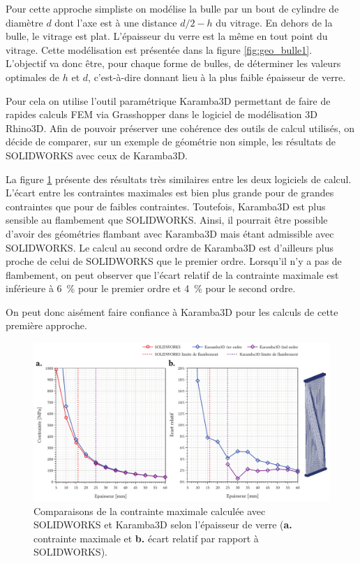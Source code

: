 \documentclass[11pt,titlepage]{article}
\begin{document}
Pour cette approche simpliste on modélise la bulle par un bout de cylindre de diamètre $d$ dont l'axe est à une distance $d/2-h$ du vitrage. En dehors de la bulle, le vitrage est plat. L'épaisseur du verre est la même en tout point du vitrage. Cette modélisation est présentée dans la figure \ref{fig:geo_bulle1}.
\\

L'objectif va donc être, pour chaque forme de bulles, de déterminer les valeurs optimales de $h$ et $d$, c'est-à-dire donnant lieu à la plus faible épaisseur de verre. 

Pour cela on utilise l'outil paramétrique Karamba3D permettant de faire de rapides calculs \acrshort{FEM} via Grasshopper dans le logiciel de modélisation 3D Rhino3D. Afin de pouvoir préserver une cohérence des outils de calcul utilisés, on décide de comparer, sur un exemple de géométrie non simple, les résultats de SOLIDWORKS avec ceux de Karamba3D.

La figure \ref{fig:comp_kar} présente des résultats très similaires entre les deux logiciels de calcul. L'écart entre les contraintes maximales est bien plus grande pour de grandes contraintes que pour de faibles contraintes. Toutefois, Karamba3D est plus sensible au flambement que SOLIDWORKS. Ainsi, il pourrait être possible d'avoir des géométries flambant avec Karamba3D mais étant admissible avec SOLIDWORKS. Le calcul au second ordre de Karamba3D est d'ailleurs plus proche de celui de SOLIDWORKS que le premier ordre. Lorsqu'il n'y a pas de flambement, on peut observer que l'écart relatif de la contrainte maximale est inférieure à \qty{6}{\percent} pour le premier ordre et \qty{4}{\percent} pour le second ordre. 

On peut donc aisément faire confiance à Karamba3D pour les calculs de cette première approche.

\begin{figure}[H]
    \centering
    \includegraphics[width=\linewidth]{img/bulle/comp_kar.pdf}
    \caption{Comparaisons de la contrainte maximale calculée avec SOLIDWORKS et Karamba3D selon l'épaisseur de verre (\textbf{a.} contrainte maximale et \textbf{b.} écart relatif par rapport à SOLIDWORKS).}
    \label{fig:comp_kar}
\end{figure}
\end{document}
